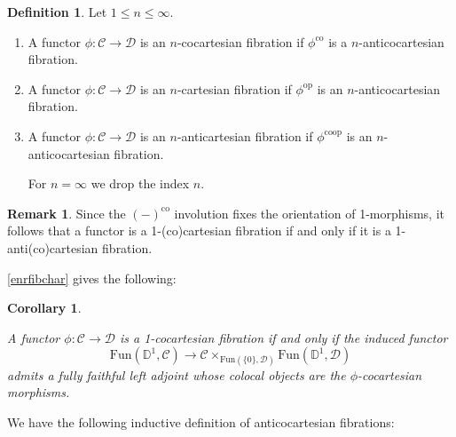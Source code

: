 \documentclass[10pt,oneside]{article}
\numberwithin{equation}{section} %
\numberwithin{figure}{section} %
\theoremstyle{plain}
\newtheorem{corollary}[theorem]{Corollary}
\theoremstyle{definition}
\newtheorem{definition}[theorem]{Definition}
\newtheorem{remark}[theorem]{Remark}
\newcommand{\bD}{{\mathbb D}}
\newcommand{\mC}{{\mathcal C}}
\newcommand{\mD}{{\mathcal D}}
\newcommand{\op}{\mathrm{op}}
\newcommand{\co}{\mathrm{co}}
\newcommand{\Fun}{\mathrm{Fun}}
\begin{document}
\begin{definition}Let $1 \leq n \leq \infty. $

\begin{enumerate}[\normalfont(1)]\setlength{\itemsep}{-2pt}

\item A functor $\phi: \mC \to \mD$ is an $n$-cocartesian fibration if $\phi^\co$ is a $n$-anticocartesian fibration.

\item A functor $\phi: \mC \to \mD$ is an $n$-cartesian fibration if $\phi^{\op}$ is an $n$-anticocartesian fibration.

\item A functor $\phi: \mC \to \mD$ is an $n$-anticartesian fibration if $\phi^{\co\op}$ is an $n$-anticocartesian fibration.

For $n=\infty$ we drop the index $n.$

\end{enumerate}
    
\end{definition}



\begin{remark}
Since the $(-)^\co$ involution fixes the orientation of 1-morphisms, it follows that a functor is a 1-(co)cartesian fibration if and only if it is a 1-anti(co)cartesian fibration.

\end{remark}

\cref{enrfibchar} gives the following:

\begin{corollary}\label{fibchar}

A functor $\phi: \mC \to \mD$ is a 1-cocartesian fibration if and only if the induced functor $$\Fun(\bD^1,\mC) \to \mC \times_{\Fun(\{0\},\mD)} \Fun(\bD^1, \mD) $$ admits a fully faithful left adjoint whose colocal objects are the $\phi$-cocartesian morphisms.
    
\end{corollary}



We have the following inductive definition of anticocartesian fibrations:
\end{document}
